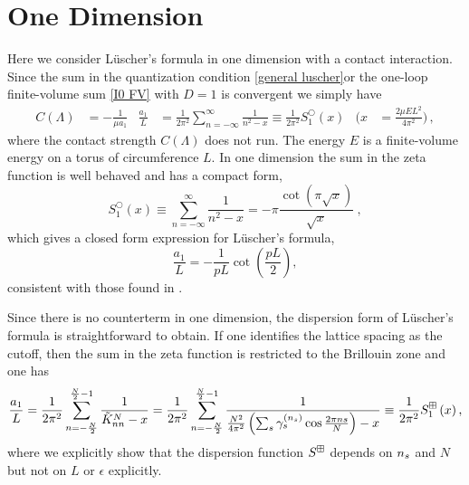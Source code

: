 \section{One Dimension}\label{sec:1D}

Here we consider L\"uscher's formula in one dimension with a contact interaction.
Since the sum in the quantization condition \eqref{general luscher}or the one-loop finite-volume sum \eqref{I0 FV} with $D=1$ is convergent we simply have %
\begin{align}\label{eq:tuning-1d}
    C(\Lambda)
    &=
            -\frac{1}{\mu a_{1}}
    &
    \frac{a_{1}}{L}
        &=
            \frac{1}{2 \pi^{2}}
            \sum_{n=-\infty}^{\infty} \frac{1}{n^{2}-x}
        \equiv
            \frac{1}{2 \pi^{2}}
            S^\bigcirc_{1}\left(x\right)
    &
    \Bigg(x
        &=
            \frac{2\mu E L^2}{4\pi^2}\Bigg)
    \, ,
\end{align}
where the contact strength $C(\Lambda)$ does not run.
The energy $E$ is a finite-volume energy on a torus of circumference $L$.
In one dimension the sum in the zeta function is well behaved and has a compact form,
\begin{equation}\label{eq:1d luscher}
S^\bigcirc_{1}(x) \equiv \sum_{n=-\infty}^{\infty} \frac{1}{n^{2}-x}=-\pi \frac{\cot (\pi \sqrt{x})}{\sqrt{x}}\ ,
\end{equation}
which gives a closed form expression for L\"uscher's formula,
\begin{equation}\label{eq:1d luscher constant}
\frac{a_{1}}{L} =-\frac{1}{pL}\cot\left(\frac{pL}{2}\right),
\end{equation}
consistent with those found in \cite{Luscher:1990ck,Zhu:2019dho}.

Since there is no counterterm in one dimension, the dispersion form of L\"uscher's formula is straightforward to obtain.  If one identifies the lattice spacing as the cutoff, then the sum in the zeta function is restricted to the Brillouin zone and one has
\begin{equation}
    \frac{a_{1}}{L}
    =
    \frac{1}{2 \pi^{2}} \sum_{n=-\frac{N}{2}}^{\frac{N}{2}-1} \frac{1}{\tilde{K}^N_{nn}-x}
    =
    \frac{1}{2 \pi^{2}} \sum_{n=-\frac{N}{2}}^{\frac{N}{2}-1} \frac{1}{\frac{N^2}{4\pi^2}\left(\sum_{s}\gamma_s^{({n_s})}\cos\frac{2\pi n s}{N}\right)-x}
    \equiv
    \frac{1}{2 \pi^{2}} S^{\boxplus}_{1}\left(x\right),\label{eq:1d dispersion luscher}
\end{equation}
where we explicitly show that the dispersion function $S^{\boxplus}$ depends on ${n_s}$ and $N$ but not on $L$ or $\epsilon$ explicitly.

